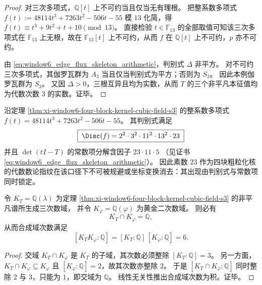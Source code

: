 \begin{proof}
对三次多项式，\(\mathbb Q[t]\) 上不可约当且仅当无有理根。
把整系数多项式
\(
f(t):=48114t^3+7263t^2-506t-55
\)
模 \(13\) 化简，得
\(
f(t)\equiv t^3+9t^2+t+10\pmod{13}
\)。
直接检验 \(t\in\mathbb F_{13}\) 的全部取值可知该三次多项式在 \(\mathbb F_{13}\) 上无根，故在 \(\mathbb F_{13}[t]\) 上不可约，从而 \(f\) 在 \(\mathbb Q[t]\) 上不可约，\(p\) 亦不可约。
\par
由 \eqref{eq:window6_edge_flux_skeleton_arithmetic}，判别式 \(\Delta\) 非平方。
对不可约三次多项式，其伽罗瓦群为 \(A_3\) 当且仅当判别式为平方；否则为 \(S_3\)。
因此本例伽罗瓦群为 \(S_3\)。
又因 \(\Delta>0\)，三根互异且均为实数，从而 \(T\) 的三个非平凡本征值均为代数次数 \(3\) 的实数。证毕。
\end{proof}

\begin{corollary}\label{cor:xi-window6-four-block-kernel-disc-audit-prime-23}
沿定理 \ref{thm:xi-window6-four-block-kernel-cubic-field-s3} 的整系数多项式
\(
f(t)=48114t^3+7263t^2-506t-55
\)。
其判别式满足
\[
\boxed{\;
\Disc(f)
=2^{2}\cdot 3^{2}\cdot 11^{2}\cdot 13^{2}\cdot 23\;}
\]
并且 \(\det(tI-T)\) 的常数项分解含因子
\(
23\cdot 11\cdot 5
\)
（见证书 \eqref{eq:window6_edge_flux_skeleton_arithmetic}）。
因此素数 \(23\) 作为四块粗粒化核的代数数论指纹在该口径下不可被规避或坐标变换消去：其出现由判别式与常数项同时锁定。
\end{corollary}

\begin{corollary}\label{cor:xi-window6-field-disjointness-degree-six}
令 \(K_T=\mathbb Q(\lambda)\) 为定理 \ref{thm:xi-window6-four-block-kernel-cubic-field-s3} 的非平凡谱所生成三次数域，
并令 \(K_\varphi=\mathbb Q(\varphi)\) 为黄金二次数域。
则必有
\[
K_T\cap K_\varphi=\mathbb Q,
\]
从而合成域次数满足
\[
[K_TK_\varphi:\mathbb Q]=[K_T:\mathbb Q]\,[K_\varphi:\mathbb Q]=6.
\]
\end{corollary}

\begin{proof}
交域 \(K_T\cap K_\varphi\) 是 \(K_T\) 的子域，其次数必须整除 \([K_T:\mathbb Q]=3\)。
另一方面，\(K_T\cap K_\varphi\subseteq K_\varphi\) 且 \([K_\varphi:\mathbb Q]=2\)，故其次数亦整除 \(2\)。
于是 \([K_T\cap K_\varphi:\mathbb Q]\) 同时整除 \(2\) 与 \(3\)，只能为 \(1\)，即交域为 \(\mathbb Q\)。
线性无关性推出合成域次数为积。证毕。
\end{proof}

